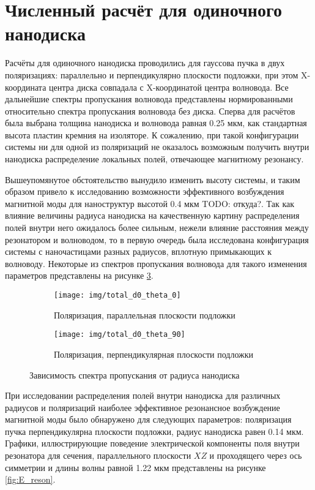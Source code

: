 \section{Численный расчёт для одиночного нанодиска}

Расчёты для одиночного нанодиска проводились для гауссова пучка в двух поляризациях: параллельно и перпендикулярно плоскости подложки, при этом X-координата центра диска совпадала с X-координатой центра волновода. Все дальнейшие спектры пропускания волновода представлены нормированными относительно спектра пропускания волновода без диска. Сперва для расчётов была выбрана толщина нанодиска и волновода равная 0.25 мкм, как стандартная высота пластин кремния на изоляторе. К сожалению, при такой конфигурации системы ни для одной из поляризаций не оказалось возможным получить внутри нанодиска распределение локальных полей, отвечающее магнитному резонансу. 

Вышеупомянутое обстоятельство вынудило изменить высоту системы, и таким образом привело к исследованию возможности эффективного возбуждения магнитной моды для наноструктур высотой 0.4 мкм TODO: откуда?. Так как влияние величины радиуса нанодиска на качественную картину распределения полей внутри него ожидалось более сильным, нежели влияние расстояния между резонатором и волноводом, то в первую очередь была исследована конфигурация системы с наночастицами разных радиусов, вплотную примыкающих к волноводу. Некоторые из спектров пропускания волновода для такого изменения параметров представлены на рисунке \ref{fig:1x_fixed_d}.

\begin{figure}[h]
	\begin{subfigure}[b]{\textwidth}
		\centering
		\texttt{[image: img/total\_d0\_theta\_0]}
		\caption{Поляризация, параллельная плоскости подложки}
		\label{fig:1x_fixed_d_theta_0}
	\end{subfigure}

	\begin{subfigure}[b]{\textwidth}
		\centering
		\texttt{[image: img/total\_d0\_theta\_90]}
		\caption{Поляризация, перпендикулярная плоскости подложки}
		\label{fig:1x_fixed_d_theta_90}
	\end{subfigure}
  
  	\caption{Зависимость спектра пропускания от радиуса нанодиска}
  	\label{fig:1x_fixed_d}
\end{figure}

При исследовании распределения полей внутри нанодиска для различных радиусов и поляризаций наиболее эффективное резонансное возбуждение магнитной моды было обнаружено для следующих параметров: поляризация пучка перпендикулярна плоскости подложки, радиус нанодиска равен 0.14 мкм. Графики, иллюстрирующие поведение электрической компоненты поля внутри резонатора для сечения, параллельного плоскости $XZ$ и проходящего через ось симметрии и длины волны равной 1.22 мкм представлены на рисунке \ref{fig:E_reson}.

